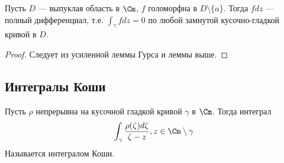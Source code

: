 \begin{theorem}
    Пусть \(D\) --- выпуклая область в \(\Cm\), \(f\) голоморфна в \(D \setminus \{a\}\). Тогда \(fdz\) --- полный дифференциал, т.е. \(\int_\gamma fdz = 0\) по любой замнутой кусочно-гладкой кривой в \(D\).
\end{theorem}
\begin{proof}
    Следует из усиленной леммы Гурса и леммы выше.
\end{proof}

\subsection{Интегралы Коши}
\begin{definition}
    Пусть \(\rho\) непрерывна на  кусочной гладкой кривой \(\gamma\) в \(\Cm\). Тогда интеграл 
    \[\int_\gamma \frac{\rho(\zeta)d\zeta}{\zeta - z}, z \in \Cm \setminus \gamma\]
    Называется интегралом Коши.
\end{definition}


